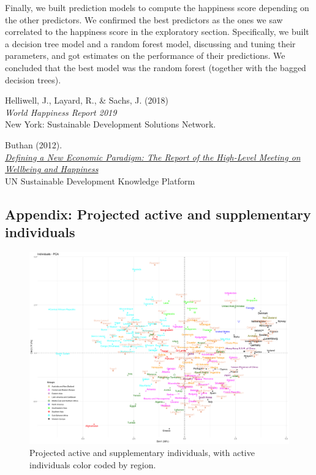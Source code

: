 \documentclass[12pt]{extarticle}
\begin{document}
Finally, we built prediction models to compute the happiness score depending on the other predictors. We confirmed the best predictors as the ones we saw correlated to the happiness score in the exploratory section.
Specifically, we built a decision tree model and a random forest model, discussing and tuning their parameters, and got estimates on the performance of their predictions. We concluded that the best model was the random forest (together with the bagged decision trees).

\begin{thebibliography}{9}

Helliwell, J., Layard, R., \& Sachs, J. (2018)\\
\textit{World Happiness Report 2019}\\
New York: Sustainable Development Solutions Network.

Buthan (2012).\\
\textit{\href{https://sustainabledevelopment.un.org/index.php?page=view&type=400&nr=617&menu=35}{Defining a New Economic Paradigm: The Report of the High-Level Meeting on Wellbeing and Happiness}}\\
UN Sustainable Development Knowledge Platform




\end{thebibliography}


\newpage


\begin{landscape}
\thispagestyle{empty}
\section{Appendix: Projected active and supplementary individuals}
\begin{figure}[H]
  \centering
    \includegraphics[width=1.1\textwidth]{figures/pca_individuals_suplementaries.png}
    \caption{Projected active and supplementary individuals, with active individuals color coded by region.\label{fig:pca-ind-sup}}
\end{figure}
\end{landscape}
\end{document}
